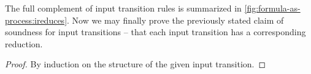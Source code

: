 The full complement of input transition rules is summarized in \cref{fig:formula-as-process:ireduces}.
Now we may finally prove the previously stated claim of soundness for input transitions -- that each input transition has a corresponding reduction.
%
\ireducessoundness
\begin{proof}
  By induction on the structure of the given input transition.
\end{proof}





